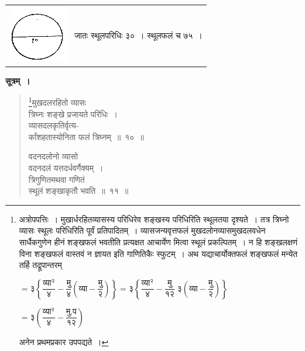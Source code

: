 \documentclass[11pt, openany]{book}
\begin{document}
\begin{table}[h!]
    \begin{tabular}{lr}
     \multirow{8}{*}{ \includegraphics{graphics/capture4.png}}&  \multirow{8}{*}{जातः स्थूलपरिधिः ३०~। स्थूलफलं च ७५~। }\\
         & \\
          &  \\
          &  \\
          &  \\
          &  \\
          &  \\
          &  \\
    \end{tabular}
\end{table}
\newpage
\textbf{सूत्रम्~।}
\setcounter{footnote}{0}
 \begin{quote}
     \bs 
     \footnote{अत्रोपपत्तिः~। मुखार्धरहितव्यासस्य परिधिरेव शङ्खस्य
परिधिरिति स्थूलतया दृश्यते~। तत्र त्रिघ्नो व्यासः स्थूलः परिधिरिति पूर्वं प्रतिपादितम्~। व्यासजन्यवृत्तफलं मुखदलोनव्यासमुखदलवधेन सार्धैकगुणेन हीनं शङ्खफलं भवतीति प्रत्यक्षत
आचार्येण मित्वा स्थूलं प्रकल्पितम्~। न हि शङ्खलक्षणं
विना शङ्खफलं वास्तवं न ज्ञायत इति गाणितिकैः स्फुटम्~। 
अथ यद्याचार्योक्तफलं शङ्खफलं मन्येत तर्हि तद्रूपान्तरम् 
\vspace{2mm}

\hspace{2mm} $= \mbox{३} \left\{\dfrac{\mbox{व्या}^{\text{२}}}{\mbox{४}}
  - \dfrac{\mbox{मु}}{\mbox{४}}\left(\mbox{व्या} - \dfrac{\mbox{मु}}{\mbox{२}}\right)
 \right\} = \mbox{३} \left\{\dfrac{\mbox{व्या}^{\text{२}}}{\mbox{४}}
  - \dfrac{\mbox{मु}}{\mbox{१२}}\;\mbox{३}\left(\mbox{व्या} - \dfrac{\mbox{मु}}{\mbox{२}}\right)
 \right\}$
\vspace{2mm}

\hspace{2mm} $= \mbox{३} \left(\dfrac{\mbox{व्या}^{\text{२}}}{\mbox{४}}
  - \dfrac{\mbox{मु.प}}{\mbox{१२}}\right)$
\vspace{2mm}

\hspace{2mm} अनेन प्रथमप्रकार उपपद्यते~। }मुखदलरहितो व्यासः \\
 त्रिघ्नः शङ्खे प्रजायते परिधिः~।\\
व्यासदलकृतिर्वृत्य-\\
र्कांशहतास्योनिता फलं त्रिघ्नम्~॥~१०~॥
 \vspace{1mm}
 
वदनदलोनो व्यासो \\
वदनदलं यत्तदर्धवर्गैक्यम्~।\\
त्रिगुणितमथवा गणितं \\
स्थूलं शङ्खाकृतौ भवति~॥~११~॥
 \end{quote}
\end{document}
